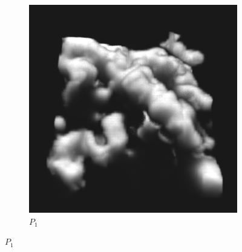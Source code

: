 \begin{figure}[h]
\begin{subfigure}{0.49\columnwidth}
\includegraphics[width=\columnwidth]{04_pn_method/results/nebulae_p1_ms.png}
\caption{$P_1$}
\label{fig:pn_results_nebulae1_P1}
\end{subfigure}%


\end{figure}
